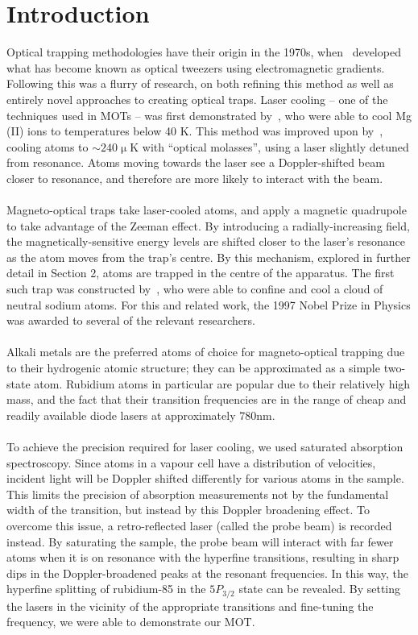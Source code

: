 \documentclass[11pt,twoside,a4paper]{article}
\begin{document}
\section{Introduction}
Optical trapping methodologies have their origin in the 1970s, when~\cite{ashkin1970} developed what has become known
as optical tweezers using electromagnetic gradients. Following this was a flurry of research, on both refining this method
as well as entirely novel approaches to creating optical traps. Laser cooling -- one of the techniques used in MOTs -- was
first demonstrated by~\cite{wineland1978}, who were able to cool Mg (II) ions to temperatures below 40 K. This method was improved
upon by~\cite{chu1985}, cooling atoms to \(\sim240 \operatorname{\mu}\)K with ``optical molasses'', using a laser slightly detuned from resonance.
Atoms moving towards the laser see a Doppler-shifted beam closer to resonance, and therefore are more likely to interact with the beam.
\\\\
Magneto-optical traps take laser-cooled atoms, and apply a magnetic quadrupole to take advantage of the Zeeman effect. By
introducing a radially-increasing field, the magnetically-sensitive energy levels are shifted closer to the laser's resonance as the atom moves
from the trap's centre. By this mechanism, explored in further detail in Section 2, atoms are trapped in the centre of the
apparatus. The first such trap was constructed by~\cite{raab1987}, who were able to confine and cool a cloud of neutral sodium atoms. For this and related
work, the 1997 Nobel Prize in Physics was awarded to several of the relevant researchers.
\\\\
Alkali metals are the preferred atoms of choice for magneto-optical trapping due to their hydrogenic atomic structure; they can be approximated
as a simple two-state atom. Rubidium atoms in particular are popular due to their relatively high mass, and the fact that their transition frequencies
are in the range of cheap and readily available diode lasers at approximately 780nm.
\\\\
To achieve the precision required for laser cooling, we used saturated absorption spectroscopy. Since atoms in a vapour cell have a distribution of velocities,
incident light will be Doppler shifted differently for various atoms in the sample. This limits the precision of absorption measurements not by the fundamental width
of the transition, but instead by this Doppler broadening effect. To overcome this issue, a retro-reflected laser (called the probe beam) is recorded instead. By saturating the sample,
the probe beam will interact with far fewer atoms when it is on resonance with the hyperfine transitions, resulting in sharp dips in the Doppler-broadened peaks at the resonant frequencies.
In this way, the hyperfine splitting of rubidium-85 in the \(5P_{3/2}\) state can be revealed. By setting the lasers in the vicinity of the appropriate transitions and fine-tuning the frequency,
we were able to demonstrate our MOT.\@
\vfill
\pagebreak
\end{document}

